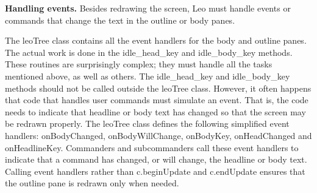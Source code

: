 \documentclass[a4paper,10pt,english]{sphinxmanual}
\begin{document}
\textbf{Handling events.} Besides redrawing the screen, Leo must handle events or
commands that change the text in the outline or body panes.

The leoTree class contains all the event handlers for the body and outline
panes. The actual work is done in the idle\_head\_key and idle\_body\_key methods.
These routines are surprisingly complex; they must handle all the tasks
mentioned above, as well as others. The idle\_head\_key and idle\_body\_key methods
should not be called outside the leoTree class. However, it often happens that
code that handles user commands must simulate an event. That is, the code needs
to indicate that headline or body text has changed so that the screen may be
redrawn properly. The leoTree class defines the following simplified event
handlers: onBodyChanged, onBodyWillChange, onBodyKey, onHeadChanged and
onHeadlineKey. Commanders and subcommanders call these event handlers to
indicate that a command has changed, or will change, the headline or body text.
Calling event handlers rather than c.beginUpdate and c.endUpdate ensures that
the outline pane is redrawn only when needed.
\end{document}
